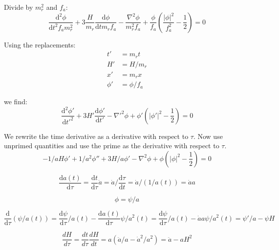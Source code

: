 \documentclass[a4paper]{article}
\begin{document}
Divide by $m_r^2$ and $f_a$:
\begin{equation}
    \frac{\mathrm{d}^2 {\phi}}{\mathrm{d} t^2 f_a m_r^2} + 3 \frac{H}{m_r} \frac{\mathrm{d} \phi}{\mathrm{d} t m_r f_a} - \frac{\nabla^2 \phi}{m_r^2 f_a} + \frac{\phi}{f_a} \left( \frac{ |\phi|^2 } { f_a^2 } - \frac{1}{2} \right) = 0
\end{equation}

Using the replacements:
\begin{align}
    t' &= m_r t \\
    H' &= H / m_r \\
    x' &= m_r x \\
    \phi' &= \phi / f_a
\end{align}

we find:
\begin{equation}
    \frac{\mathrm{d}^2 \phi'}{\mathrm{d} t'^2} + 3 H' \frac{\mathrm{d} \phi'}{\mathrm{d} t'} - \nabla'^2 \phi + \phi' \left( |\phi'|^2 - \frac{1}{2} \right) = 0
\end{equation}

We rewrite the time derivative as a derivative with respect to $\tau$.
Now use unprimed quantities and use the prime as the derivative with respect to $\tau$.
\begin{equation}
    - 1/a H \phi' + 1/a^2 \phi'' + 3 H / a \phi'
    - \nabla^2 \phi + \phi \left( |\phi|^2 - \frac{1}{2} \right) = 0
\end{equation}

\begin{equation}
    \frac{\mathrm{d} a(t)}{\mathrm{d} \tau} = \frac{\mathrm{d} t}{\mathrm{d} \tau} \dot{a} = \dot{a} / \frac{\mathrm{d} \tau}{\mathrm{d} t} = \dot{a} / (1 / a(t)) = \dot{a} a
\end{equation}

\begin{equation}
    \phi = \psi / a
\end{equation}

\begin{equation}
    \frac{\mathrm{d}}{\mathrm{d} \tau} ( \psi / a(t) ) = \frac{\mathrm{d} \psi}{\mathrm{d} \tau} / a(t) - \frac{\mathrm{d} a(t)}{\mathrm{d} \tau} \psi / a^2(t)
    = \frac{\mathrm{d} \psi}{\mathrm{d} \tau} / a(t) - \dot{a} a \psi / a^2(t)
    = \psi' / a - \psi H
\end{equation}

\begin{equation}
    \frac{d H}{d \tau} = \frac{d t}{d \tau} \frac{d H}{d t} = a (\ddot{a} / a - \dot{a}^2 / a^2) = \ddot{a} - a H^2
\end{equation}
\end{document}

